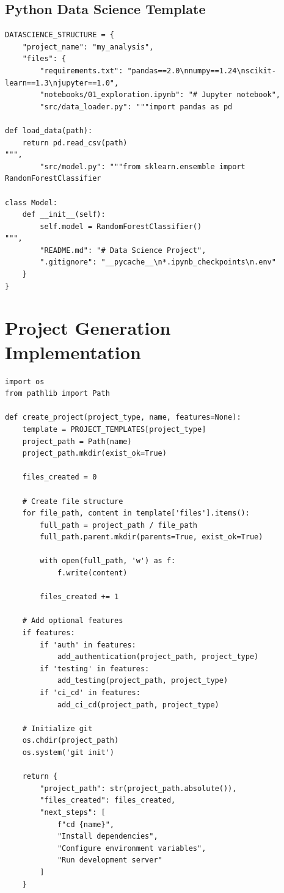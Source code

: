 \documentclass{report}
\begin{document}
\subsection{Python Data Science Template}

\begin{lstlisting}
DATASCIENCE_STRUCTURE = {
    "project_name": "my_analysis",
    "files": {
        "requirements.txt": "pandas==2.0\nnumpy==1.24\nscikit-learn==1.3\njupyter==1.0",
        "notebooks/01_exploration.ipynb": "# Jupyter notebook",
        "src/data_loader.py": """import pandas as pd

def load_data(path):
    return pd.read_csv(path)
""",
        "src/model.py": """from sklearn.ensemble import RandomForestClassifier

class Model:
    def __init__(self):
        self.model = RandomForestClassifier()
""",
        "README.md": "# Data Science Project",
        ".gitignore": "__pycache__\n*.ipynb_checkpoints\n.env"
    }
}
\end{lstlisting}

\section{Project Generation Implementation}

\begin{lstlisting}
import os
from pathlib import Path

def create_project(project_type, name, features=None):
    template = PROJECT_TEMPLATES[project_type]
    project_path = Path(name)
    project_path.mkdir(exist_ok=True)
    
    files_created = 0
    
    # Create file structure
    for file_path, content in template['files'].items():
        full_path = project_path / file_path
        full_path.parent.mkdir(parents=True, exist_ok=True)
        
        with open(full_path, 'w') as f:
            f.write(content)
        
        files_created += 1
    
    # Add optional features
    if features:
        if 'auth' in features:
            add_authentication(project_path, project_type)
        if 'testing' in features:
            add_testing(project_path, project_type)
        if 'ci_cd' in features:
            add_ci_cd(project_path, project_type)
    
    # Initialize git
    os.chdir(project_path)
    os.system('git init')
    
    return {
        "project_path": str(project_path.absolute()),
        "files_created": files_created,
        "next_steps": [
            f"cd {name}",
            "Install dependencies",
            "Configure environment variables",
            "Run development server"
        ]
    }
\end{lstlisting}
\end{document}
